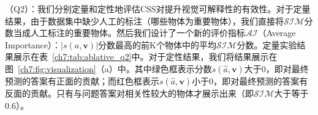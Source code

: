 \textbf{}（Q2）：我们分别定量和定性地评估CSS对提升视觉可解释性的有效性。对于定量结果，由于数据集中缺少人工的标注（哪些物体为重要物体），我们直接将$\mathcal{SIM}$分数当成人工标注的重要物体。然后我们设计了一个新的评价指标$\mathcal{AI}$（Average Importance）：$|s(a, \bm{v})|$分数最高的前K个物体中的平均$\mathcal{SIM}$分数。定量实验结果展示在表~\ref{ch7:tab:ablative_q2}中。对于定性结果，我们将结果展示在图~\ref{ch7:fig:visualization}（a）中。其中绿色框表示分数$s(\hat{a}, \bm{v})$大于0，即对最终预测的答案有正面的贡献；而红色框表示$s(\hat{a}, \bm{v})$小于0，即对最终预测的答案有反面的贡献。只有与问题答案对相关性较大的物体才展示出来（即$\mathcal{SIM}$大于等于0.6）。

\begin{table}[tbp]
    \begin{center}
    \end{center}
    \caption{VQA-CP v2测试集的准确率}
    \label{ch7:tab:ablative_q1}
\end{table}

\begin{table}[tbp]
    \begin{center}
    \end{center}
    \caption{VQA-CP v2测试集的$\mathcal{AI}$分数}
    \label{ch7:tab:ablative_q2}
\end{table}

